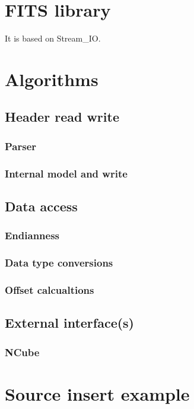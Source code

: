 \documentclass[a4paper,10pt]{article}
\begin{document}
\tableofcontents

\section{FITS library}

It is based on Stream\_IO.

\section{Algorithms}

\subsection{Header read write}
\subsubsection{Parser}
\subsubsection{Internal model and write}

\subsection{Data access}
\subsubsection{Endianness}
\subsubsection{Data type conversions}
\subsubsection{Offset calcualtions}

\subsection{External interface(s)}
\subsubsection{NCube}



\section{Source insert example}
\end{document}
